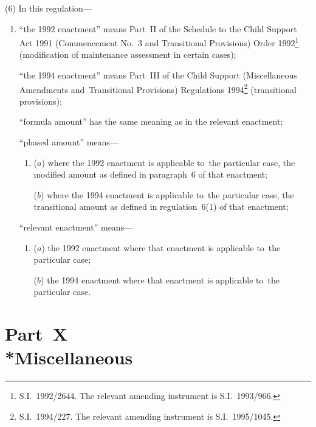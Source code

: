 \documentclass[12pt,a4paper]{article}
\begin{document}
(6) In this regulation—
\begin{enumerate}\item[]
“the 1992 enactment” means Part~II of the Schedule to the Child Support Act 1991
(Commencement No.\ 3 and Transitional Provisions) Order 1992\footnote{\frenchspacing S.I.~1992/2644. The relevant amending instrument is S.I.~1993/966.} (modification of
maintenance assessment in certain cases);

“the 1994 enactment” means Part~III of the Child Support (Miscellaneous
Amendments and~Transitional Provisions) Regulations 1994\footnote{\frenchspacing S.I.~1994/227. The relevant amending instrument is S.I.~1995/1045.} (transitional
provisions);

“formula amount” has the same meaning as in the relevant enactment;

“phased amount” means—
\begin{enumerate}\item[]
($a$) where the 1992 enactment is applicable to~the particular case, the modified
amount as defined in paragraph~6 of that enactment;

($b$) where the 1994 enactment is applicable to~the particular case, the
transitional amount as defined in regulation~6(1) of that enactment;
\end{enumerate}

“relevant enactment” means—
\begin{enumerate}\item[]
($a$) the 1992 enactment where that enactment is applicable to~the particular case;

($b$) the 1994 enactment where that enactment is applicable to~the particular case.
\end{enumerate}
\end{enumerate}


\section[Part~X --- Miscellaneous]{Part~X\\*Miscellaneous}

\renewcommand\parthead{--- Part~X}
\end{document}
